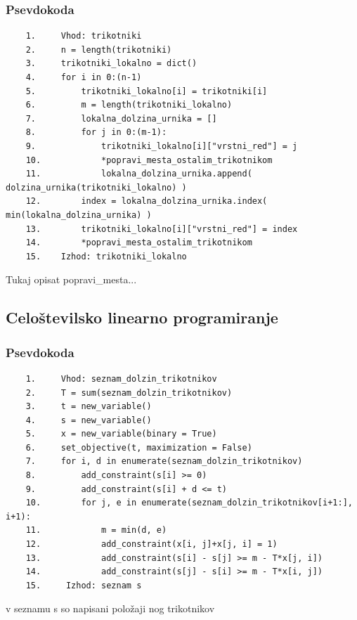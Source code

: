 \documentclass[a4paper,12pt]{article}
\theoremstyle{definition}
\theoremstyle{plain}
\begin{document}
\subsubsection{Psevdokoda}
\begin{verbatim}
    1.     Vhod: trikotniki
    2.     n = length(trikotniki)
    3.     trikotniki_lokalno = dict()
    4.     for i in 0:(n-1)
    5.         trikotniki_lokalno[i] = trikotniki[i]
    6.         m = length(trikotniki_lokalno)
    7.         lokalna_dolzina_urnika = []
    8.         for j in 0:(m-1):
    9.             trikotniki_lokalno[i]["vrstni_red"] = j
    10.            *popravi_mesta_ostalim_trikotnikom
    11.            lokalna_dolzina_urnika.append( dolzina_urnika(trikotniki_lokalno) )
    12.        index = lokalna_dolzina_urnika.index( min(lokalna_dolzina_urnika) )
    13.        trikotniki_lokalno[i]["vrstni_red"] = index
    14.        *popravi_mesta_ostalim_trikotnikom
    15.    Izhod: trikotniki_lokalno

\end{verbatim}


Tukaj opisat popravi\_mesta...


\subsection{Celoštevilsko linearno programiranje}
\subsubsection{Psevdokoda}
\begin{verbatim}
    1.     Vhod: seznam_dolzin_trikotnikov
    2.     T = sum(seznam_dolzin_trikotnikov)
    3.     t = new_variable()
    4.     s = new_variable()
    5.     x = new_variable(binary = True)
    6.     set_objective(t, maximization = False)
    7.     for i, d in enumerate(seznam_dolzin_trikotnikov)
    8.         add_constraint(s[i] >= 0)
    9.         add_constraint(s[i] + d <= t)
    10.        for j, e in enumerate(seznam_dolzin_trikotnikov[i+1:], i+1):
    11.            m = min(d, e)
    12.            add_constraint(x[i, j]+x[j, i] = 1)
    13.            add_constraint(s[i] - s[j] >= m - T*x[j, i])
    14.            add_constraint(s[j] - s[i] >= m - T*x[i, j])
    15.     Izhod: seznam s
\end{verbatim}
v seznamu s so napisani položaji nog trikotnikov
\end{document}
